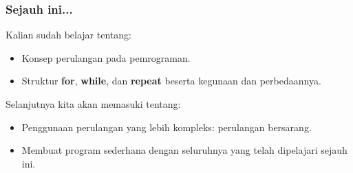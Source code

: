 \begin{frame}
\frametitle{Sejauh ini...}
Kalian sudah belajar tentang:
\begin{itemize}
  \item Konsep perulangan pada pemrograman.
  \item Struktur \textbf{for}, \textbf{while}, dan \textbf{repeat} beserta kegunaan dan perbedaannya.
\end{itemize}
Selanjutnya kita akan memasuki tentang:
\begin{itemize}
  \item Penggunaan perulangan yang lebih kompleks: perulangan bersarang.
  \item Membuat program sederhana dengan seluruhnya yang telah dipelajari sejauh ini.
\end{itemize}
\end{frame}


